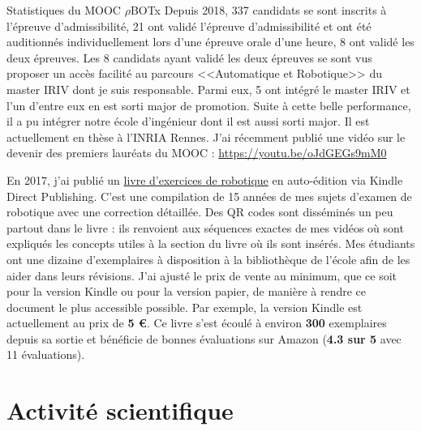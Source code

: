 \documentclass[a4paper,12pt]{article}
\newcommand{\Separation}{\noindent{\color{black!40}\rule{\textwidth}{2pt}}}
\begin{document}
\begin{flipbox}{Statistiques du MOOC $\rho$BOTx}   
   Depuis 2018, 337 candidats se sont inscrits à l'épreuve d'admissibilité,  21 ont validé l'épreuve d'admissibilité et ont été auditionnés individuellement lors d'une épreuve orale d'une heure, 8 ont validé les deux épreuves. Les 8 candidats ayant validé les deux épreuves se sont vus proposer un accès facilité au parcours <<Automatique et Robotique>> du master IRIV dont je suis responsable. Parmi eux, 5 ont intégré le master IRIV et l'un d'entre eux en est sorti major de promotion. Suite à cette belle performance, il a pu intégrer notre école d'ingénieur dont il est aussi sorti major. Il est actuellement en thèse à l'INRIA Rennes. J'ai récemment publié une vidéo sur le devenir des premiers lauréats du MOOC : \url{https://youtu.be/oJdGEGs9mM0}
\end{flipbox}

En 2017, j'ai publié un \href{https://amzn.eu/d/bexz1iP}{livre d'exercices de robotique} en auto-édition via Kindle Direct Publishing. C'est une compilation de 15 années de mes sujets d'examen de robotique avec une correction détaillée. Des QR codes sont disséminés un peu partout dans le livre : ils renvoient aux séquences exactes de mes vidéos où sont expliqués les concepts utiles à la section du livre où ils sont insérés. Mes étudiants ont une dizaine d'exemplaires à disposition à la bibliothèque de l'école afin de les aider dans leurs révisions. J'ai ajusté le prix de vente au minimum, que ce soit pour la version Kindle ou pour la version papier, de manière à rendre ce document le plus accessible possible. Par exemple, la version Kindle est actuellement au prix de {\bf 5 €}. Ce livre s'est écoulé à environ {\bf 300} exemplaires depuis sa sortie et bénéficie de bonnes évaluations sur Amazon ({\bf 4.3 sur 5} avec 11 évaluations).

\Separation{}


\section{Activité scientifique}
\newrefsection

\end{document}
